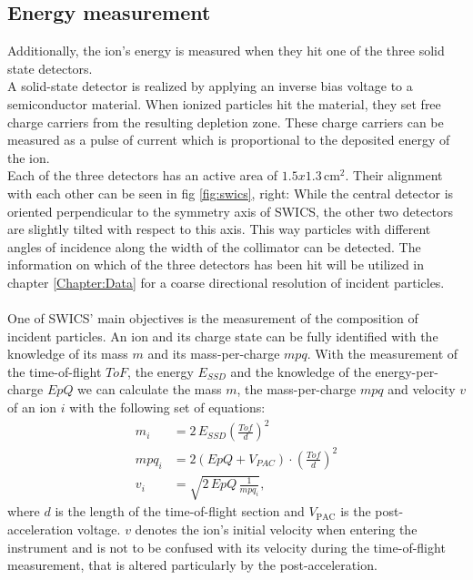 \subsection{Energy measurement}
Additionally, the ion's energy is measured when they hit one of the three solid state detectors. \\
A solid-state detector is realized by applying an inverse bias voltage to a semiconductor material. When ionized particles hit the material, they set free charge carriers from the resulting depletion zone. These charge carriers can be measured as a pulse of current which is proportional to the deposited energy of the ion. \\
Each of the three detectors has an active area of $1.5 x 1.3 \,\mathrm{cm^2}$. Their alignment with each other can be seen in fig \ref{fig:swics}, right: While the central detector is oriented perpendicular to the symmetry axis of SWICS, the other two detectors are slightly tilted with respect to this axis. This way particles with different angles of incidence along the width of the collimator can be detected. The information on which of the three detectors has been hit will be utilized in chapter \ref{Chapter:Data} for a coarse directional resolution of incident particles.
\\ \\
One of SWICS' main objectives is the measurement of the composition of incident particles. An ion and its charge state can be fully identified with the knowledge of its mass $m$ and its mass-per-charge $mpq$. 
With the measurement of the time-of-flight $ToF$, the energy $E_{SSD}$ and the knowledge of the energy-per-charge $EpQ$ we can calculate the mass $m$, the mass-per-charge $mpq$ and velocity $v$ of an ion $i$ with the following set of equations:
\begin{align}
m_i &= 2\,E_{SSD} \left( \frac{Tof}{d}\right)^2 \label{eq:swics_set1}\\
mpq_i &= 2 \left(EpQ + V_{PAC}\right) \cdot \left(\frac{Tof}{d}\right)^2 \label{eq:swics_set2} \\
v_i &= \sqrt{2\,EpQ\,\frac{1}{mpq_i}},
\label{eq:swics_set3}
\end{align}
where $d$ is the length of the time-of-flight section and $V_{\mathrm{PAC}}$ is the post-acceleration voltage. $v$ denotes the ion's initial velocity when entering the instrument and is not to be confused with its velocity during the time-of-flight measurement, that is altered particularly by the post-acceleration.
%
%
%
